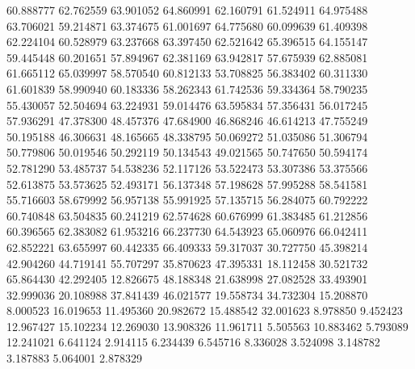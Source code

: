 60.888777
62.762559
63.901052
64.860991
62.160791
61.524911
64.975488
63.706021
59.214871
63.374675
61.001697
64.775680
60.099639
61.409398
62.224104
60.528979
63.237668
63.397450
62.521642
65.396515
64.155147
59.445448
60.201651
57.894967
62.381169
63.942817
57.675939
62.885081
61.665112
65.039997
58.570540
60.812133
53.708825
56.383402
60.311330
61.601839
58.990940
60.183336
58.262343
61.742536
59.334364
58.790235
55.430057
52.504694
63.224931
59.014476
63.595834
57.356431
56.017245
57.936291
47.378300
48.457376
47.684900
46.868246
46.614213
47.755249
50.195188
46.306631
48.165665
48.338795
50.069272
51.035086
51.306794
50.779806
50.019546
50.292119
50.134543
49.021565
50.747650
50.594174
52.781290
53.485737
54.538236
52.117126
53.522473
53.307386
53.375566
52.613875
53.573625
52.493171
56.137348
57.198628
57.995288
58.541581
55.716603
58.679992
56.957138
55.991925
57.135715
56.284075
60.792222
60.740848
63.504835
60.241219
62.574628
60.676999
61.383485
61.212856
60.396565
62.383082
61.953216
66.237730
64.543923
65.060976
66.042411
62.852221
63.655997
60.442335
66.409333
59.317037
30.727750
45.398214
42.904260
44.719141
55.707297
35.870623
47.395331
18.112458
30.521732
65.864430
42.292405
12.826675
48.188348
21.638998
27.082528
33.493901
32.999036
20.108988
37.841439
46.021577
19.558734
34.732304
15.208870
8.000523
16.019653
11.495360
20.982672
15.488542
32.001623
8.978850
9.452423
12.967427
15.102234
12.269030
13.908326
11.961711
5.505563
10.883462
5.793089
12.241021
6.641124
2.914115
6.234439
6.545716
8.336028
3.524098
3.148782
3.187883
5.064001
2.878329
